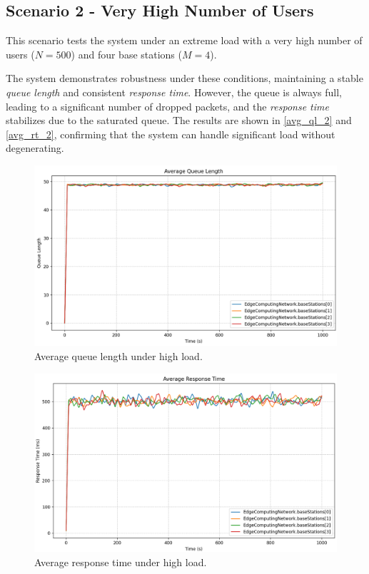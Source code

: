 \documentclass{report}
\begin{document}
\subsection{Scenario 2 - Very High Number of Users}
This scenario tests the system under an extreme load with a very high number of users ($N = 500$) and four base stations ($M = 4$). 

\begin{flushleft}
The system demonstrates robustness under these conditions, maintaining a stable \textit{queue length} and consistent \textit{response time}. However, the queue is always full, leading to a significant number of dropped packets, and the \textit{response time} stabilizes due to the saturated queue. The results are shown in \autoref{avg_ql_2} and \autoref{avg_rt_2}, confirming that the system can handle significant load without degenerating.
\end{flushleft}

\begin{figure}[H]
    \centering
    \includegraphics[width=1\textwidth]{img/avg_ql_2.png}
    \caption{Average queue length under high load.}
    \label{avg_ql_2}
\end{figure}

\begin{figure}[H]
    \centering
    \includegraphics[width=1\textwidth]{img/avg_rt_2.png}
    \caption{Average response time under high load.}
    \label{avg_rt_2}
\end{figure}
\end{document}
